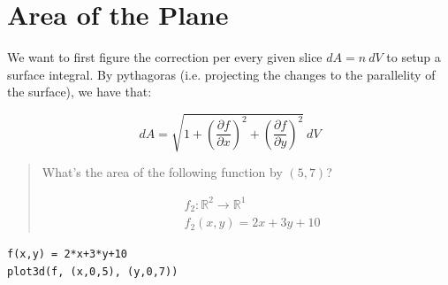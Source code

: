 \documentclass[letterpaper]{article}
\begin{document}
\section{Area of the Plane}
\label{sec:orge59cadc}
We want to first figure the correction per every given slice \(dA=n\ dV\) to setup a surface integral. By pythagoras (i.e. projecting the changes to the parallelity of the surface), we have that:

\begin{equation}
   dA = \sqrt{1+\left(\frac{\partial f}{\partial x}\right)^2+\left(\frac{\partial f}{\partial y}\right)^2}\ dV
\end{equation}

\begin{quote}
What's the area of the following function by \((5,7)\)?

\begin{align}
   &f_2: \mathbb{R}^2 \to \mathbb{R}^1 \\ 
&f_2(x,y) = 2x+3y+10
\end{align}
\end{quote}

\begin{verbatim}
f(x,y) = 2*x+3*y+10
plot3d(f, (x,0,5), (y,0,7))
\end{verbatim}
\end{document}

